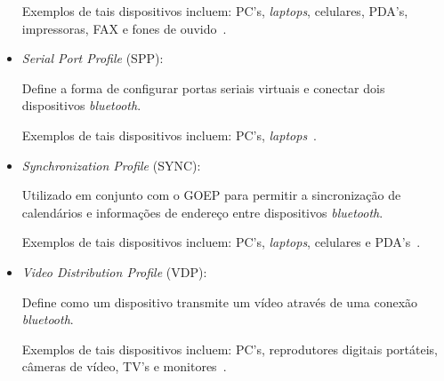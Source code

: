 \begin{itemize}
	Exemplos de tais dispositivos incluem: PC's, \emph{laptops}, celulares, PDA's, impressoras, FAX e fones de ouvido~\cite{bluetoothprofilesSDAP}.
	\item \emph{Serial Port Profile} (SPP): 

	Define a forma de configurar portas seriais virtuais e conectar dois dispositivos \emph{bluetooth}.

	Exemplos de tais dispositivos incluem: PC's, \emph{laptops}~\cite{bluetoothprofilesSPP}.
	\item \emph{Synchronization Profile} (SYNC): 

	Utilizado em conjunto com o GOEP para permitir a sincronização de calendários e informações de endereço entre dispositivos \emph{bluetooth}.

	Exemplos de tais dispositivos incluem: PC's, \emph{laptops}, celulares e PDA's~\cite{bluetoothprofilesSYNC}.
	\item \emph{Video Distribution Profile} (VDP): 

	Define como um dispositivo transmite um vídeo através de uma conexão \emph{bluetooth}.

	Exemplos de tais dispositivos incluem: PC's, reprodutores digitais portáteis, câmeras de vídeo, TV's e monitores~\cite{bluetoothprofilesVDP}.
\end{itemize}